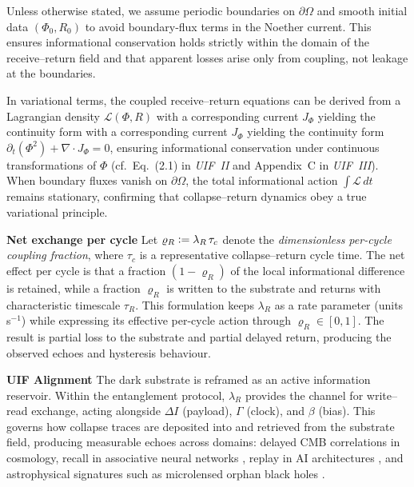 \noindent
Unless otherwise stated, we assume periodic boundaries on $\partial\Omega$
and smooth initial data $(\Phi_0,R_0)$ to avoid boundary‐flux terms
in the Noether current.  
This ensures informational conservation holds strictly within the domain of the
receive–return field and that apparent losses arise only from coupling,
not leakage at the boundaries.

\noindent
In variational terms, the coupled receive–return equations can be derived from a 
Lagrangian density $\mathcal{L}(\Phi,R)$ with a corresponding current $J_{\Phi}$ yielding the continuity form with a corresponding current $J_{\Phi}$ yielding the continuity form 
$\partial_t(\Phi^2)+\nabla\!\cdot J_\Phi=0$,  ensuring informational conservation 
under continuous transformations of $\Phi$ (cf.\ Eq.~(2.1) in \textit{UIF~II} 
and Appendix~C in \textit{UIF~III}).  
When boundary fluxes vanish on $\partial\Omega$, the total informational action 
$\int \!\mathcal{L}\,dt$ remains stationary, confirming that collapse–return dynamics 
obey a true variational principle.  
\newline


\noindent \textbf{Net exchange per cycle}
\newline
Let $\varrho_{R} \vcentcolon= \lambda_{R}\,\tau_{c}$ denote the \emph{dimensionless per-cycle coupling fraction}, 
where $\tau_{c}$ is a representative collapse–return cycle time.  
The net effect per cycle is that a fraction $(1-\varrho_{R})$ of the local informational difference is 
retained, while a fraction $\varrho_{R}$ is written to the substrate and returns with characteristic 
timescale $\tau_{R}$.  
This formulation keeps $\lambda_{R}$ as a rate parameter (units s$^{-1}$) while expressing its effective 
per-cycle action through $\varrho_{R}\!\in\![0,1]$.  
The result is partial loss to the substrate and partial delayed return, producing the observed echoes 
and hysteresis behaviour.
\newline


\noindent
\textbf{UIF Alignment} 
\newline
The dark substrate is reframed as an active information reservoir. Within the entanglement protocol, $\lambda_R$ provides the channel for write–read exchange, acting alongside $\Delta I$ (payload), $\Gamma$ (clock), and $\beta$ (bias). This governs how collapse traces are deposited into and retrieved from the substrate field, producing measurable echoes across domains: delayed CMB correlations in cosmology, recall in associative neural networks \cite{Hopfield1982}, replay in AI architectures \cite{Lin1992}, and astrophysical signatures such as microlensed orphan black holes \cite{Mroz2022b}.
\newline

